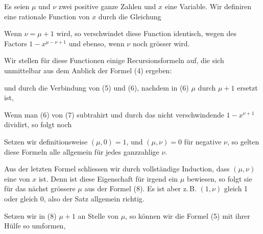 
Es seien $\mu$ und $\nu$ zwei positive ganze Zahlen und $x$ eine
Variable. Wir definiren eine rationale Function von $x$ durch
die Gleichung


Wenn $\nu = \mu + 1$ wird, so verschwindet diese Function
identisch, wegen des Factors $1 - x^{\mu - \nu + 1}$ und ebenso, wenn $\nu$
noch grösser wird.

Wir stellen für diese Functionen einige Recursionsformeln
auf, die sich unmittelbar aus dem Anblick der Formel (4) ergeben:



und durch die Verbindung von (5) und (6), nachdem in (6) $\mu$
durch $\mu + 1$ ersetzt ist,


Wenn man (6) von (7) subtrahirt und durch das nicht verschwindende $1 - x^{\nu + 1}$ dividirt, so folgt noch


Setzen wir definitionsweise $(\mu, 0) = 1$, und $(\mu, \nu) = 0$ für
negative $\nu$, so gelten diese Formeln alle allgemein für jedes
ganzzahlige $\nu$.

Aus der letzten Formel schliessen wir durch vollständige
Induction, dass $(\mu, \nu)$ eine  von $x$ ist. Denn
ist diese Eigenschaft für irgend ein $\mu$ bewiesen, so folgt sie für
das nächst grössere $\mu$ aus der Formel (8). Es ist aber z.\,B.
$(1, \nu)$ gleich 1 oder gleich 0, also der Satz allgemein richtig.

Setzen wir in (8) $\mu + 1$ an Stelle von $\mu$, so können wir
die Formel (5) mit ihrer Hülfe so umformen,


